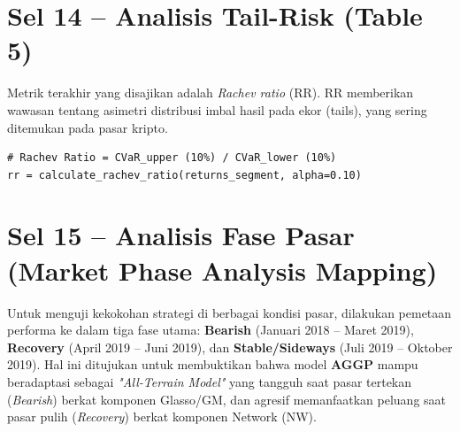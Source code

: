\documentclass[12pt,a4paper]{article}
\begin{document}
\section{Sel 14 -- Analisis Tail-Risk (Table 5)}
Metrik terakhir yang disajikan adalah \textit{Rachev ratio} (RR). RR memberikan wawasan tentang asimetri distribusi imbal hasil pada ekor (tails), yang sering ditemukan pada pasar kripto.

\begin{lstlisting}[caption={Kalkulasi Rachev Ratio Periodik}]
# Rachev Ratio = CVaR_upper (10%) / CVaR_lower (10%)
rr = calculate_rachev_ratio(returns_segment, alpha=0.10)
\end{lstlisting}

\begin{table}[h]
    \centering
    \footnotesize
    \caption{\textbf{TABLE 5 | Rachev ratio.} This table shows the 4-months values of Rachev Ratio (RR) of portfolios under different strategies. In particular, the RR is computed across all baseline models, network approaches, and the proposed \textbf{AGGP}.}
\end{table}

\section{Sel 15 -- Analisis Fase Pasar (Market Phase Analysis Mapping)}
Untuk menguji kekokohan strategi di berbagai kondisi pasar, dilakukan pemetaan performa ke dalam tiga fase utama: \textbf{Bearish} (Januari 2018 -- Maret 2019), \textbf{Recovery} (April 2019 -- Juni 2019), dan \textbf{Stable/Sideways} (Juli 2019 -- Oktober 2019). Hal ini ditujukan untuk membuktikan bahwa model \textbf{AGGP} mampu beradaptasi sebagai \textit{"All-Terrain Model"} yang tangguh saat pasar tertekan (\textit{Bearish}) berkat komponen Glasso/GM, dan agresif memanfaatkan peluang saat pasar pulih (\textit{Recovery}) berkat komponen Network (NW).
\end{document}
